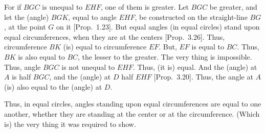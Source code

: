 \begin{Parallel}{}{}
{For if $BGC$ is unequal to $EHF$, one of them is greater. Let $BGC$ be greater, 
and let the (angle) $BGK$, equal to  angle $EHF$, be constructed on the
straight-line $BG$, at the point $G$ on it [Prop.~1.23]. But equal angles (in equal circles) stand upon equal circumferences, when they are at the centers [Prop.~3.26]. Thus,
circumference $BK$ (is) equal to circumference $EF$. But, $EF$ is equal to $BC$.
Thus, $BK$ is also equal to $BC$, the lesser to the greater. The very thing is
impossible. Thus, angle $BGC$ is not unequal to $EHF$. Thus, (it is) equal.
And the (angle) at $A$ is half $BGC$, and the (angle) at $D$ half $EHF$ [Prop.~3.20]. Thus, the angle at $A$ (is) also equal to the (angle) at $D$.

Thus, in equal circles, angles standing upon equal circumferences  are equal to one
another, whether they are standing at the center or at the circumference.
(Which is) the very thing it was required to show.\\}
\end{Parallel}

